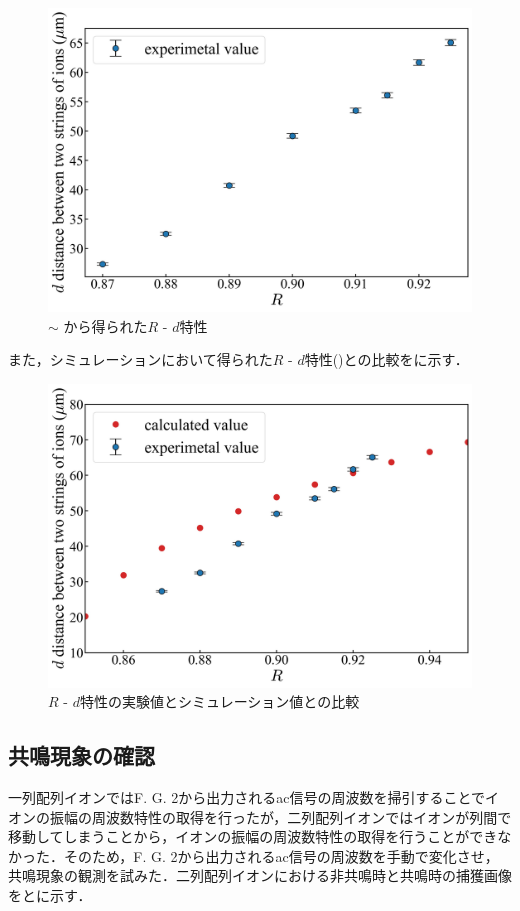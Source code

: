 \begin{figure}[h]
	\begin{center}
		\includegraphics[width = 0.6\linewidth]{./results/figure/2D_meas_R_d.jpg}
		\caption{ $\sim$ から得られた$R$ - $d$特性}
		\label{fig:R_d}
	\end{center}
\end{figure}

また，シミュレーションにおいて得られた$R$ - $d$特性()との比較をに示す．

\begin{figure}[h]
	\begin{center}
		\includegraphics[width = 0.6\linewidth]{./results/figure/2D_Calc_vs_Meas_R-d.jpg}
		\caption{$R$ - $d$特性の実験値とシミュレーション値との比較}
		\label{fig:R-d_Calc_vs_Meas}
	\end{center}
\end{figure}
%
\clearpage
%
\subsection{共鳴現象の確認}
一列配列イオンではF. G. 2から出力されるac信号の周波数を掃引することでイオンの振幅の周波数特性の取得を行ったが，二列配列イオンではイオンが列間で移動してしまうことから，イオンの振幅の周波数特性の取得を行うことができなかった．そのため，F. G. 2から出力されるac信号の周波数を手動で変化させ，共鳴現象の観測を試みた．二列配列イオンにおける非共鳴時と共鳴時の捕獲画像をとに示す．

